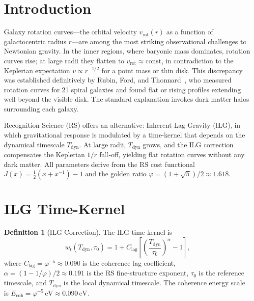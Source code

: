 \documentclass[12pt,a4paper]{article}
\theoremstyle{definition}
\newtheorem{definition}[theorem]{Definition}
\theoremstyle{remark}
\begin{document}
\section{Introduction}
\label{sec:intro}

Galaxy rotation curves---the orbital velocity $v_{\mathrm{rot}}(r)$
as a function of galactocentric radius $r$---are among the most
striking observational challenges to Newtonian gravity.  In the inner
regions, where baryonic mass dominates, rotation curves rise; at
large radii they flatten to $v_{\mathrm{rot}} \approx \mathrm{const}$,
in contradiction to the Keplerian expectation $v \propto r^{-1/2}$
for a point mass or thin disk.  This discrepancy was established
definitively by Rubin, Ford, and Thonnard~\cite{Rubin1980}, who
measured rotation curves for 21 spiral galaxies and found flat or
rising profiles extending well beyond the visible disk.  The standard
explanation invokes dark matter halos surrounding each galaxy.

Recognition Science (RS) offers an alternative: Inherent Lag Gravity
(ILG), in which gravitational response is modulated by a time-kernel
that depends on the dynamical timescale $T_{\mathrm{dyn}}$.  At large
radii, $T_{\mathrm{dyn}}$ grows, and the ILG correction compensates
the Keplerian $1/r$ fall-off, yielding flat rotation curves without
any dark matter.  All parameters derive from the RS cost functional
$J(x) = \frac{1}{2}(x + x^{-1}) - 1$ and the golden ratio
$\varphi = (1 + \sqrt{5})/2 \approx 1.618$.

\section{ILG Time-Kernel}
\label{sec:ilg}

\begin{definition}[ILG Correction]
\label{def:ilg}
The ILG time-kernel is
\begin{equation}
  w_t(T_{\mathrm{dyn}}, \tau_0) = 1 + C_{\mathrm{lag}}
  \left[\left(\frac{T_{\mathrm{dyn}}}{\tau_0}\right)^\alpha - 1
  \right],
\end{equation}
where $C_{\mathrm{lag}} = \varphi^{-5} \approx 0.090$ is the coherence
lag coefficient, $\alpha = (1 - 1/\varphi)/2 \approx 0.191$ is the RS
fine-structure exponent, $\tau_0$ is the reference timescale, and
$T_{\mathrm{dyn}}$ is the local dynamical timescale.  The coherence
energy scale is $E_{\mathrm{coh}} = \varphi^{-5}\,\mathrm{eV}
\approx 0.090\,\mathrm{eV}$.
\end{definition}
\end{document}

